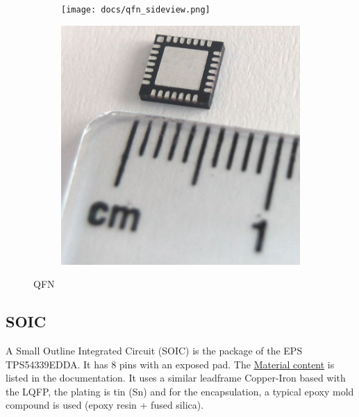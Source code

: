 \documentclass[final]{cubedoc}
\begin{document}
\begin{figure}[h!]
\centering
\begin{subfigure}{.5\textwidth}
  \centering
  \texttt{[image: docs/qfn\_sideview.png]}
  \caption{}
  \label{fig:sub1}
\end{subfigure}%
\begin{subfigure}{.5\textwidth}
  \centering
  \includegraphics[keepaspectratio, width=0.5\linewidth, height=.3\textheight]{docs/qfn_real.jpg}
  \caption{}
  \label{fig:sub2}
\end{subfigure}
\caption{QFN}
\label{fig:test}
\end{figure}

\pagebreak












\subsection{SOIC}

A Small Outline Integrated Circuit (SOIC) is the package of the EPS TPS54339EDDA. It has 8 pins with an exposed pad. The  \href{https://www.ti.com/materialcontent/en/report?pcid=271639&opn=TPS54339EDDA}{Material content} is listed in the documentation. It uses a similar leadframe Copper-Iron based with the LQFP, the plating is tin (Sn) and for the encapsulation, a typical epoxy mold compound is used (epoxy resin + fused silica). 
\end{document}
